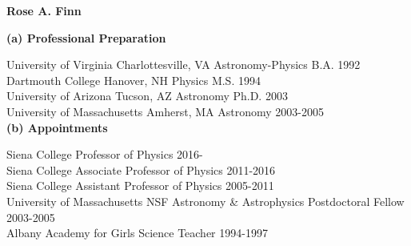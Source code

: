\documentclass[11pt]{article}
\begin{document}

\begin{center}
{\Large \bf Rose A. Finn} \\

\end{center}

\vspace{-1cm}
\begin{flushleft}


\medskip
{\bf (a) Professional Preparation} 
\noindent

University of Virginia \hfill Charlottesville, VA \hfill Astronomy-Physics \hfill B.A. 1992 \\
Dartmouth College \hfill Hanover, NH \hfill Physics \hfill M.S. 1994 \\
University of Arizona \hfill Tucson, AZ \hfill  Astronomy \hfill Ph.D. 2003 \\
University of Massachusetts \hfill Amherst, MA \hfill Astronomy \hfill 2003-2005 \\


\medskip
{\bf (b) Appointments} 

\noindent
Siena College \hfill  Professor of Physics \hfill 2016-\\
Siena College \hfill  Associate Professor of Physics \hfill 2011-2016\\
Siena College \hfill  Assistant Professor of Physics \hfill 2005-2011\\
University of Massachusetts  \hfill NSF Astronomy \& Astrophysics Postdoctoral Fellow \hfill 2003-2005\\
Albany Academy for Girls \hfill Science Teacher \hfill 1994-1997



\end{flushleft}
\end{document}
